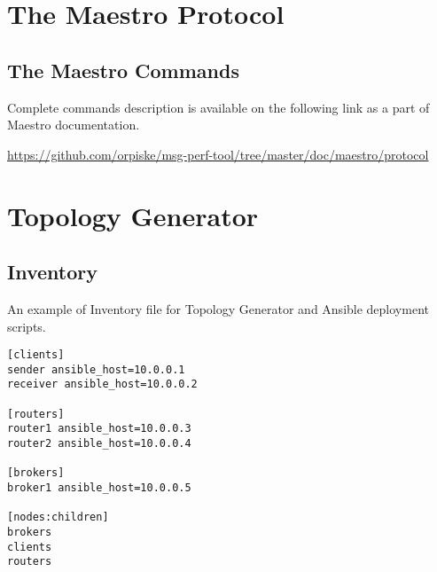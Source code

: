 

\chapter{The Maestro Protocol}

\section{The Maestro Commands}
\label{AP:commands}
Complete commands description is available on the following link as a part of Maestro documentation.

\url{https://github.com/orpiske/msg-perf-tool/tree/master/doc/maestro/protocol}

\chapter{Topology Generator} %

\section{Inventory}
\label{AP:Inventory}
An example of Inventory file for Topology Generator and Ansible deployment scripts.

\begin{verbatim}
[clients]
sender ansible_host=10.0.0.1					
receiver ansible_host=10.0.0.2

[routers]
router1 ansible_host=10.0.0.3
router2 ansible_host=10.0.0.4

[brokers]
broker1 ansible_host=10.0.0.5

[nodes:children]
brokers
clients
routers
\end{verbatim}

